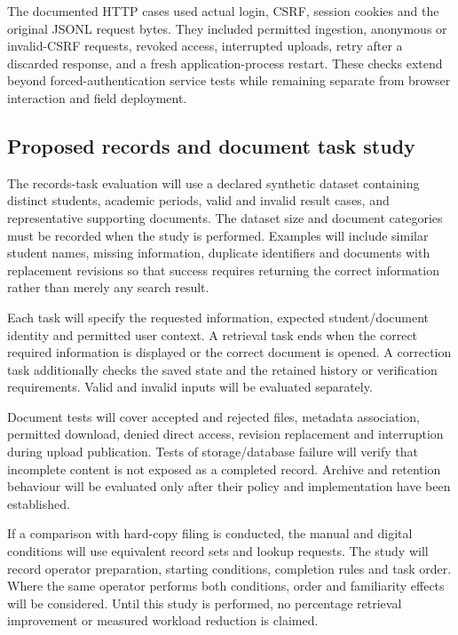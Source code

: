 The documented HTTP cases used actual login, CSRF, session cookies and the original JSONL request bytes. They included permitted ingestion, anonymous or invalid-CSRF requests, revoked access, interrupted uploads, retry after a discarded response, and a fresh application-process restart. These checks extend beyond forced-authentication service tests while remaining separate from browser interaction and field deployment.

\subsection{Proposed records and document task study}\label{sec:3-10-3}

The records-task evaluation will use a declared synthetic dataset containing distinct students, academic periods, valid and invalid result cases, and representative supporting documents. The dataset size and document categories must be recorded when the study is performed. Examples will include similar student names, missing information, duplicate identifiers and documents with replacement revisions so that success requires returning the correct information rather than merely any search result.

Each task will specify the requested information, expected student/document identity and permitted user context. A retrieval task ends when the correct required information is displayed or the correct document is opened. A correction task additionally checks the saved state and the retained history or verification requirements. Valid and invalid inputs will be evaluated separately.

Document tests will cover accepted and rejected files, metadata association, permitted download, denied direct access, revision replacement and interruption during upload publication. Tests of storage/database failure will verify that incomplete content is not exposed as a completed record. Archive and retention behaviour will be evaluated only after their policy and implementation have been established.

If a comparison with hard-copy filing is conducted, the manual and digital conditions will use equivalent record sets and lookup requests. The study will record operator preparation, starting conditions, completion rules and task order. Where the same operator performs both conditions, order and familiarity effects will be considered. Until this study is performed, no percentage retrieval improvement or measured workload reduction is claimed.


